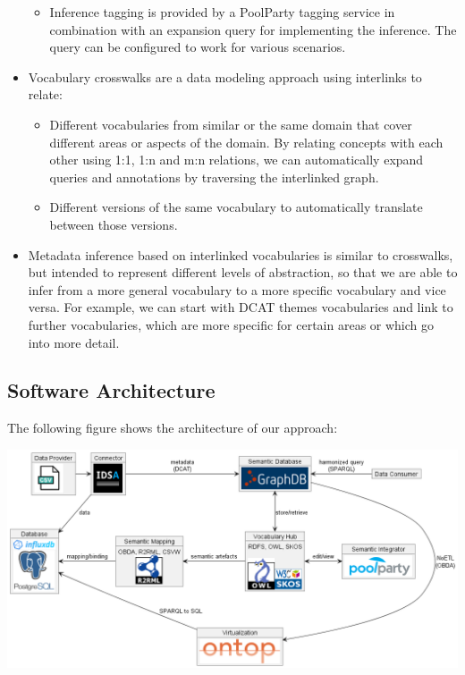 \documentclass[
  super,
  preprint,
  3p]{elsarticle}
\providecommand{\tightlist}{%
  \setlength{\itemsep}{0pt}\setlength{\parskip}{0pt}}\usepackage{longtable,booktabs,array}
\begin{document}
\begin{itemize}
  \begin{itemize}
  \tightlist
  \item
    Inference tagging is provided by a PoolParty tagging service in
    combination with an expansion query for implementing the inference.
    The query can be configured to work for various scenarios.
  \end{itemize}
\item
  Vocabulary crosswalks are a data modeling approach using interlinks to
  relate:

  \begin{itemize}
  \tightlist
  \item
    Different vocabularies from similar or the same domain that cover
    different areas or aspects of the domain. By relating concepts with
    each other using 1:1, 1:n and m:n relations, we can automatically
    expand queries and annotations by traversing the interlinked graph.
  \item
    Different versions of the same vocabulary to automatically translate
    between those versions.
  \end{itemize}
\item
  Metadata inference based on interlinked vocabularies is similar to
  crosswalks, but intended to represent different levels of abstraction,
  so that we are able to infer from a more general vocabulary to a more
  specific vocabulary and vice versa. For example, we can start with
  DCAT themes vocabularies and link to further vocabularies, which are
  more specific for certain areas or which go into more detail.
\end{itemize}

\subsection{Software Architecture}\label{software-architecture}

The following figure shows the architecture of our approach:

\includegraphics{img/architecture.png}
\end{document}

